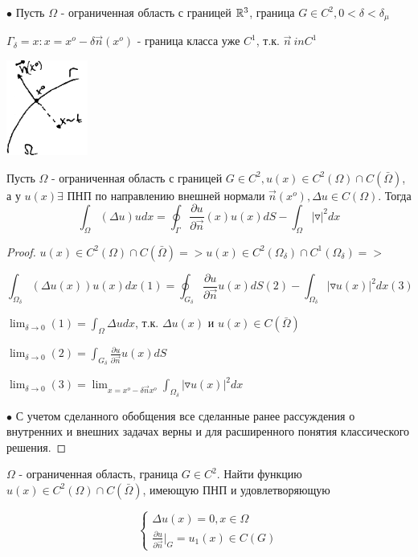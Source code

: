 $\bullet$ Пусть $\Omega$ - ограниченная область с границей $\mathbb{R}^3$, граница $G \in C^2, 0 < \delta < \delta_{\mu}$

$\Gamma_{\delta} = {x: x = x^o - \delta \vec{n}(x^o)}$ - граница класса уже $C^1$, т.к. $\vec{n} \ in C^1$
\begin{center}
\includegraphics[width=0.2\textwidth]{31_2_new}
\end{center}
\begin{lemma}
Пусть $\Omega$ - ограниченная область с границей $G \in C^2, u(x) \in C^2(\Omega) \cap C(\bar{\Omega})$, а у $u(x) \exists $ ПНП по направлению внешней нормали $\vec{n}(x^o), \Delta u \in C(\Omega)$. Тогда $$\int_{\Omega} (\Delta u)udx = \oint_{\Gamma} \frac{\partial u}{\partial \vec{n}}(x) u(x)dS - \int_{\Omega} |\triangledown|^2 dx $$
\end{lemma}
\begin{proof}
$u(x) \in C^2(\Omega) \cap C(\bar{\Omega}) => u(x) \in C^2(\Omega_{\delta}) \cap C^1(\Omega_{\delta}) => $

$$\int_{\Omega_{\delta}}(\Delta u(x))u(x)dx (1) = \oint_{G_{\delta}} \frac{\partial u}{\partial \vec{n}}u(x)dS (2) - \int_{\Omega_{\delta}}|\triangledown u(x)|^2dx (3)$$

$\lim_{\delta \to 0}(1) = \int_{\Omega} \Delta udx$, т.к. $\Delta u(x)$ и $u(x) \in C(\bar{\Omega})$

$\lim_{\delta \to 0}(2) = \int_{G_{\delta}} \frac{\partial u}{\partial \vec{n}}u(x)dS $

$\lim_{\delta \to 0}(3) = \lim_{x = x^o - \delta \vec{n}x^o} \int_{\Omega_{\delta}} |\triangledown u(x)|^2dx$

$\bullet$ С учетом сделанного обобщения все сделанные ранее рассуждения о внутренних и внешних задачах верны и для расширенного понятия классического решения.
\end{proof}
\begin{theorem}
$\Omega$ - ограниченная область, граница $G \in C^2$. Найти функцию $u(x) \in C^2(\Omega) \cap C(\bar{\Omega})$, имеющую ПНП и удовлетворяющую 

\begin{equation}
\begin{cases}
\Delta u(x) = 0, x \in \Omega
\\
\frac{\partial u}{\partial \vec{n}}|_G = u_1(x) \in C(G)
\end{cases}
\end{equation}
\end{theorem}
